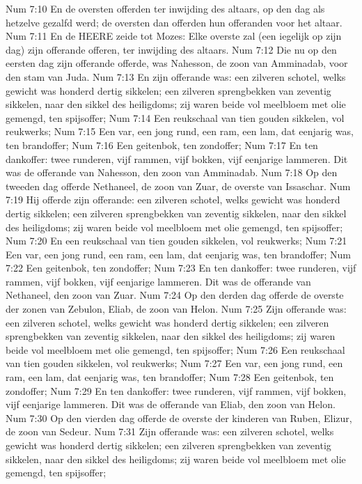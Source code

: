 Num 7:10  En de oversten offerden ter inwijding des altaars, op den dag als hetzelve gezalfd werd; de oversten dan offerden hun offeranden voor het altaar.
Num 7:11  En de HEERE zeide tot Mozes: Elke overste zal (een iegelijk op zijn dag) zijn offerande offeren, ter inwijding des altaars.
Num 7:12  Die nu op den eersten dag zijn offerande offerde, was Nahesson, de zoon van Amminadab, voor den stam van Juda.
Num 7:13  En zijn offerande was: een zilveren schotel, welks gewicht was honderd dertig sikkelen; een zilveren sprengbekken van zeventig sikkelen, naar den sikkel des heiligdoms; zij waren beide vol meelbloem met olie gemengd, ten spijsoffer;
Num 7:14  Een reukschaal van tien gouden sikkelen, vol reukwerks;
Num 7:15  Een var, een jong rund, een ram, een lam, dat eenjarig was, ten brandoffer;
Num 7:16  Een geitenbok, ten zondoffer;
Num 7:17  En ten dankoffer: twee runderen, vijf rammen, vijf bokken, vijf eenjarige lammeren. Dit was de offerande van Nahesson, den zoon van Amminadab.
Num 7:18  Op den tweeden dag offerde Nethaneel, de zoon van Zuar, de overste van Issaschar.
Num 7:19  Hij offerde zijn offerande: een zilveren schotel, welks gewicht was honderd dertig sikkelen; een zilveren sprengbekken van zeventig sikkelen, naar den sikkel des heiligdoms; zij waren beide vol meelbloem met olie gemengd, ten spijsoffer;
Num 7:20  En een reukschaal van tien gouden sikkelen, vol reukwerks;
Num 7:21  Een var, een jong rund, een ram, een lam, dat eenjarig was, ten brandoffer;
Num 7:22  Een geitenbok, ten zondoffer;
Num 7:23  En ten dankoffer: twee runderen, vijf rammen, vijf bokken, vijf eenjarige lammeren. Dit was de offerande van Nethaneel, den zoon van Zuar.
Num 7:24  Op den derden dag offerde de overste der zonen van Zebulon, Eliab, de zoon van Helon.
Num 7:25  Zijn offerande was: een zilveren schotel, welks gewicht was honderd dertig sikkelen; een zilveren sprengbekken van zeventig sikkelen, naar den sikkel des heiligdoms; zij waren beide vol meelbloem met olie gemengd, ten spijsoffer;
Num 7:26  Een reukschaal van tien gouden sikkelen, vol reukwerks;
Num 7:27  Een var, een jong rund, een ram, een lam, dat eenjarig was, ten brandoffer;
Num 7:28  Een geitenbok, ten zondoffer;
Num 7:29  En ten dankoffer: twee runderen, vijf rammen, vijf bokken, vijf eenjarige lammeren. Dit was de offerande van Eliab, den zoon van Helon.
Num 7:30  Op den vierden dag offerde de overste der kinderen van Ruben, Elizur, de zoon van Sedeur.
Num 7:31  Zijn offerande was: een zilveren schotel, welks gewicht was honderd dertig sikkelen; een zilveren sprengbekken van zeventig sikkelen, naar den sikkel des heiligdoms; zij waren beide vol meelbloem met olie gemengd, ten spijsoffer;
